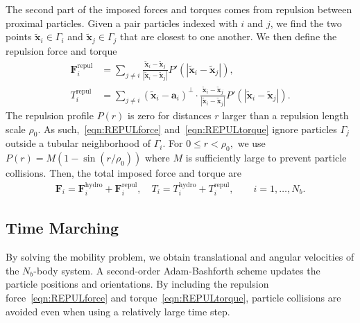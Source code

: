\documentclass[lineno]{jfm}
\renewcommand{\aa}{\mathbf{a}}
\newcommand{\FF}{\mathbf{F}}
\newcommand{\xx}{\mathbf{x}}
\newcommand{\yy}{\mathbf{y}}
\begin{document}
The second part of the imposed forces and torques comes from repulsion
between proximal particles. Given a pair particles indexed with $i$ and
$j$, we find the two points $\tilde{\xx}_i \in \Gamma_i$ and
$\tilde{\xx}_j \in \Gamma_j$ that are closest to one another. We then
define the repulsion force and torque
\begin{align}
%
  \label{eqn:REPULforce}
  \FF_i^{\text{repul}} &= \sum_{j \neq i} 
    \frac{\tilde{\xx}_i - \tilde{\xx}_j}
    {|\tilde{\xx}_i - \tilde{\xx}_j|} 
    P'(|\tilde{\xx}_i - \tilde{\xx}_j|), \\
  \label{eqn:REPULtorque}
  T_i^{\text{repul}} &= \sum_{j \neq i} 
    (\tilde{\xx}_i - \aa_i)^{\perp} \cdot 
    \frac{\tilde{\xx}_i - \tilde{\xx}_j}
    {|\tilde{\xx}_i - \tilde{\xx}_j|} 
    P'(|\tilde{\xx}_i - \tilde{\xx}_j|).
\end{align}
The repulsion profile $P(r)$ is zero for distances $r$ larger than a
repulsion length scale $\rho_0$. As such,~\eqref{eqn:REPULforce}
and~\eqref{eqn:REPULtorque} ignore particles $\Gamma_j$ outside a
tubular neighborhood of $\Gamma_i$. For $0 \leq r < \rho_0,$ we use
$P(r) = M(1 - \sin(r/\rho_0))$ where $M$ is sufficiently large to
prevent particle collisions. Then, the total imposed force and torque
are
\begin{align}
  \FF_i = \FF_i^{\text{hydro}} + \FF_i^{\text{repul}},\quad
  T_i = T_i^{\text{hydro}} + T_i^{\text{repul}}, \qquad
  i=1,\ldots,N_b.
\end{align}


\subsection{Time Marching}
By solving the mobility problem, we obtain translational and angular
velocities of the $N_b$-body system. A second-order Adam-Bashforth
scheme updates the particle positions and orientations. By including the
repulsion force~\eqref{eqn:REPULforce} and
torque~\eqref{eqn:REPULtorque}, particle collisions are avoided even
when using a relatively large time step. 



\end{document}
